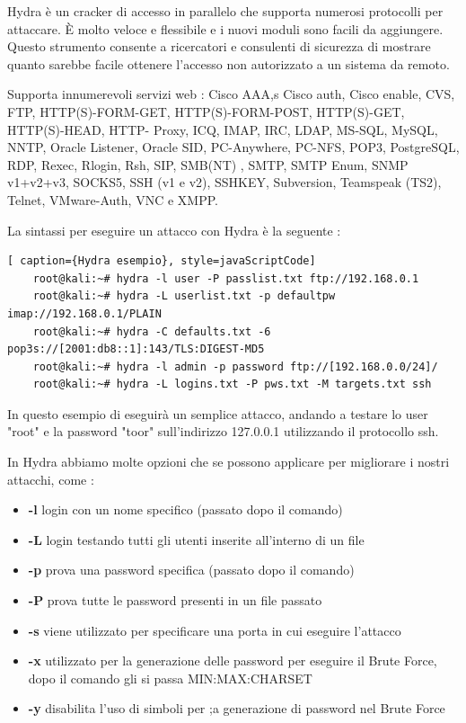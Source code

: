Hydra \cite{hydra} è un cracker di accesso in parallelo che supporta numerosi protocolli per attaccare. È molto veloce e flessibile e i nuovi moduli sono facili da aggiungere. Questo strumento consente a ricercatori e consulenti di sicurezza di mostrare quanto sarebbe facile ottenere l'accesso non autorizzato a un sistema da remoto.

Supporta innumerevoli servizi web : Cisco AAA,s Cisco auth, Cisco enable, CVS, FTP, HTTP(S)-FORM-GET, HTTP(S)-FORM-POST, HTTP(S)-GET, HTTP(S)-HEAD, HTTP- Proxy, ICQ, IMAP, IRC, LDAP, MS-SQL, MySQL, NNTP, Oracle Listener, Oracle SID, PC-Anywhere, PC-NFS, POP3, PostgreSQL, RDP, Rexec, Rlogin, Rsh, SIP, SMB(NT) , SMTP, SMTP Enum, SNMP v1+v2+v3, SOCKS5, SSH (v1 e v2), SSHKEY, Subversion, Teamspeak (TS2), Telnet, VMware-Auth, VNC e XMPP.

La sintassi per eseguire un attacco con Hydra è la seguente :

\begin{lstlisting}[ caption={Hydra esempio}, style=javaScriptCode]
    root@kali:~# hydra -l user -P passlist.txt ftp://192.168.0.1
    root@kali:~# hydra -L userlist.txt -p defaultpw imap://192.168.0.1/PLAIN
    root@kali:~# hydra -C defaults.txt -6 pop3s://[2001:db8::1]:143/TLS:DIGEST-MD5
    root@kali:~# hydra -l admin -p password ftp://[192.168.0.0/24]/
    root@kali:~# hydra -L logins.txt -P pws.txt -M targets.txt ssh
\end{lstlisting}

In questo esempio di eseguirà un semplice attacco, andando a testare lo user "root" e la password "toor" sull'indirizzo 127.0.0.1 utilizzando il protocollo ssh.

In Hydra abbiamo molte opzioni che se possono applicare per migliorare i nostri attacchi, come :
\begin{itemize}
    \item \textbf{-l} login con un nome specifico (passato dopo il comando)
    \item \textbf{-L} login testando tutti gli utenti inserite all'interno di un file 
    \item \textbf{-p} prova una password specifica (passato dopo il comando)
    \item \textbf{-P} prova tutte le password presenti in un file passato
    \item \textbf{-s} viene utilizzato per specificare una porta in cui eseguire l'attacco 
    \item \textbf{-x} utilizzato per la generazione delle password per eseguire il Brute Force, dopo il comando gli si passa MIN:MAX:CHARSET
    \item \textbf{-y} disabilita l'uso di simboli per ;a generazione di password nel Brute Force
\end{itemize}

